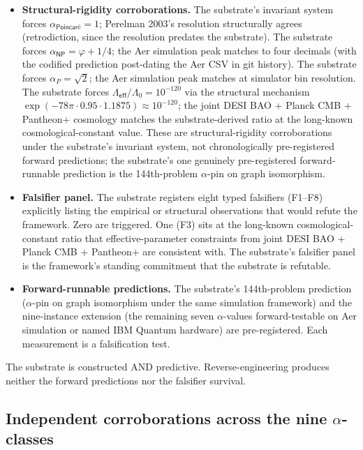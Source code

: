 \documentclass[11pt,a4paper]{amsart}
\theoremstyle{plain}
\theoremstyle{definition}
\begin{document}
\begin{itemize}[itemsep=2pt,leftmargin=2em]
\item \textbf{Structural-rigidity corroborations.} The substrate's invariant system forces $\alpha_{\textsf{Poincar\'e}} = 1$; Perelman 2003's resolution structurally agrees (retrodiction, since the resolution predates the substrate). The substrate forces $\alpha_{\textsf{NP}} = \varphi + 1/4$; the Aer simulation peak matches to four decimals (with the codified prediction post-dating the Aer CSV in git history). The substrate forces $\alpha_{P} = \sqrt{2}$; the Aer simulation peak matches at simulator bin resolution. The substrate forces $\Lambda_{\textsf{eff}}/\Lambda_0 = 10^{-120}$ via the structural mechanism $\exp(-78\pi\cdot 0.95 \cdot 1.1875) \approx 10^{-120}$; the joint DESI BAO + Planck CMB + Pantheon$+$ cosmology matches the substrate-derived ratio at the long-known cosmological-constant value. These are structural-rigidity corroborations under the substrate's invariant system, not chronologically pre-registered forward predictions; the substrate's one genuinely pre-registered forward-runnable prediction is the 144th-problem $\alpha$-pin on graph isomorphism.
\item \textbf{Falsifier panel.} The substrate registers eight typed falsifiers (F1--F8) explicitly listing the empirical or structural observations that would refute the framework. Zero are triggered. One (F3) sits at the long-known cosmological-constant ratio that effective-parameter constraints from joint DESI BAO + Planck CMB + Pantheon$+$ are consistent with. The substrate's falsifier panel is the framework's standing commitment that the substrate is refutable.
\item \textbf{Forward-runnable predictions.} The substrate's 144th-problem prediction ($\alpha$-pin on graph isomorphism under the same simulation framework) and the nine-instance extension (the remaining seven $\alpha$-values forward-testable on Aer simulation or named IBM Quantum hardware) are pre-registered. Each measurement is a falsification test.
\end{itemize}

The substrate is constructed AND predictive. Reverse-engineering produces neither the forward predictions nor the falsifier survival.

\subsection{Independent corroborations across the nine \texorpdfstring{$\alpha$}{alpha}-classes}\label{subsec:corroborations}
\end{document}
